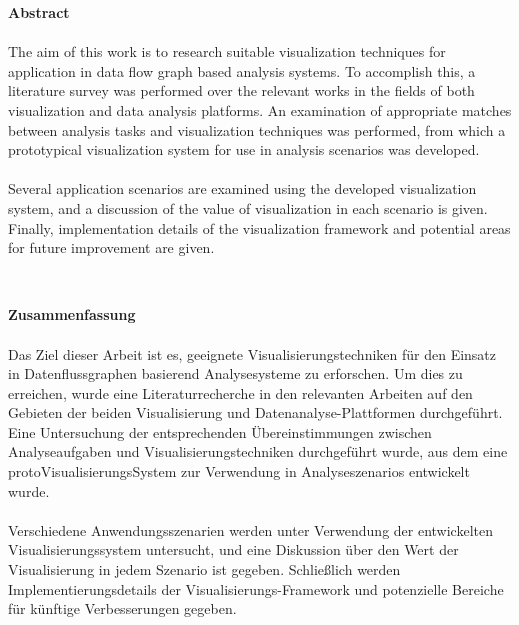 \begin{center}
\textbf{Abstract}
\end{center}

\paragraph{}
The aim of this work is to research suitable visualization techniques for application in data flow graph based analysis systems. To accomplish this, a literature survey was performed over the relevant works in the fields of both visualization and data analysis platforms. An examination of appropriate matches between analysis tasks and visualization techniques was performed, from which a prototypical visualization system for use in analysis scenarios was developed.

\paragraph{}
Several application scenarios are examined using the developed visualization system, and a discussion of the value of visualization in each scenario is given. Finally, implementation details of the visualization framework and potential areas for future improvement are given.

\ \\

\begin{center}
\textbf{Zusammenfassung}
\end{center}

\paragraph{}
Das Ziel dieser Arbeit ist es, geeignete Visualisierungstechniken für den Einsatz in Datenflussgraphen basierend Analysesysteme zu erforschen. Um dies zu erreichen, wurde eine Literaturrecherche in den relevanten Arbeiten auf den Gebieten der beiden Visualisierung und Datenanalyse-Plattformen durchgeführt. Eine Untersuchung der entsprechenden Übereinstimmungen zwischen Analyseaufgaben und Visualisierungstechniken durchgeführt wurde, aus dem eine protoVisualisierungsSystem zur Verwendung in Analyseszenarios entwickelt wurde.

\paragraph{}
Verschiedene Anwendungsszenarien werden unter Verwendung der entwickelten Visualisierungssystem untersucht, und eine Diskussion über den Wert der Visualisierung in jedem Szenario ist gegeben. Schließlich werden Implementierungsdetails der Visualisierungs-Framework und potenzielle Bereiche für künftige Verbesserungen gegeben.

\bigskip

